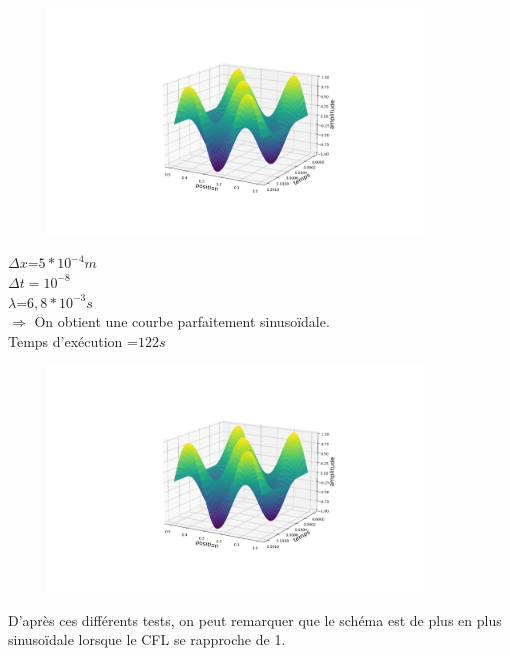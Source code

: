 \begin{enumerate}[label=\alph*)]
\begin{minipage}{.5\textwidth}
\end{minipage}%
\hfill
\begin{minipage}{.45\textwidth}%
\includegraphics[width=12cm,height=6cm]{explicitee.png}

\end{minipage}%

\begin{minipage}{.5\textwidth}%


\item $\Delta x$=$5*{10}^{-4}m$\\
$\Delta t={10}^{-8}$\\
$\lambda$=$6,8*{10}^{-3}s$\\


$\Longrightarrow$ On obtient une courbe parfaitement sinusoïdale.\\
Temps d'exécution =$122s$
\end{minipage}%
\hfill
\begin{minipage}{.45\textwidth}%
\includegraphics[width=12cm,height=6cm]{explicitee.png}
\end{minipage}%



\end{enumerate}
D'après ces différents tests, on peut remarquer que le schéma est de plus en plus sinusoïdale lorsque le CFL se rapproche de 1.\\



